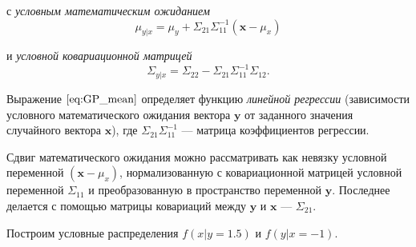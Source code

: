 \documentclass[11pt,a4paper]{article}
\begin{document}
с \emph{условным математическим ожиданием}
\[ \mu_{y|x} = \mu_y + \Sigma_{21}\Sigma_{11}^{-1}(\mathbf{x}-\mu_x) \label{eq:GP_mean}\tag{2} \]

и \emph{условной ковариационной матрицей}
\[ \Sigma_{y|x} = \Sigma_{22} - \Sigma_{21} \Sigma_{11}^{-1} \Sigma_{12}. \label{eq:GP_cov}\tag{3} \]

Выражение \(\eqref{eq:GP_mean}\) определяет функцию \emph{линейной
регрессии} (зависимости условного математического ожидания вектора
\(\mathbf{y}\) от заданного значения случайного вектора \(\mathbf{x}\)),
где \(\Sigma_{21}\Sigma_{11}^{-1}\) --- матрица коэффициентов регрессии.

Сдвиг математического ожидания можно рассматривать как невязку условной
переменной \((\mathbf{x}-\mu_x)\), нормализованную с ковариационной
матрицей условной переменной \(\Sigma_{11}\) и преобразованную в
пространство переменной \(\mathbf{y}\). Последнее делается с помощью
матрицы ковариаций между \(\mathbf{y}\) и \(\mathbf{x}\) ---
\(\Sigma_{21}\).

Построим условные распределения \(f(x|y= 1.5)\) и \(f(y|x=-1)\).
\end{document}
